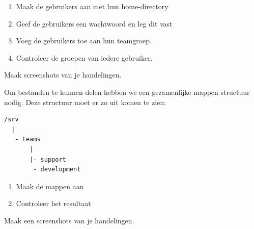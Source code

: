 \begin{enumerate}
\item Maak de gebruikers aan met hun home-directory
\item Geef de gebruikers een wachtwoord en leg dit vast
\item Voeg de gebruikers toe aan hun teamgroep.
\item Controleer de groepen van iedere gebruiker.
\end{enumerate}

Maak screenshots van je handelingen.


Om bestanden te kunnen delen hebben we een gezamenlijke mappen structuur nodig. Deze structuur moet er zo uit komen te zien:
\begin{verbatim}
/srv
  |
   - teams
       |
       |- support
        - development
\end{verbatim}

\begin{enumerate}
\item Maak de mappen aan
\item Controleer het resultaat
\end{enumerate}

Maak een screenshots van je handelingen.

